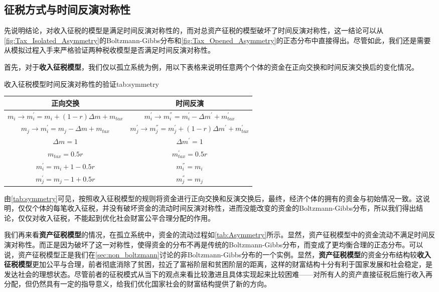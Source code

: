 \documentclass[tsinghuacite]{HustGraduPaper}
\begin{document}
	
		\subsection{征税方式与时间反演对称性}\label{subsec:tax_time_symmetry}
		
		
		先说明结论，对收入征税的模型是满足时间反演对称性的，而对总资产征税的模型破坏了时间反演对称性，这一结论可以从\autoref{fig:Tax_Isolated_Asymmetry}的Boltzmann-Gibbs分布和\autoref{fig:Tax_Opened_Asymmetry}的正态分布中直接得出。尽管如此，我们还是需要从模拟过程入手来严格验证两种税收模型是否满足时间反演对称性。
		
		首先，对于{\bfseries 收入征税模型}，我们仅以孤立系统为例，用以下表格来说明任意两个个体的资金在正向交换和时间反演交换后的变化情况。
		
		
	\begin{generaltab}{收入征税模型时间反演对称性的验证}{tab:symmetry}
		\begin{tabularx}{\textwidth}{CC}
			\toprule
			正向交换&时间反演\\
			\midrule
			$m_i \rightarrow m_i^{'} = m_i + (1-r) \Delta m + m_{tax}$ & $m_i^{'} \rightarrow m_i^{''} = m_i^{'} - \Delta m^{'} + m_{tax}^{'}$\\
			$m_j \rightarrow m_i^{'} = m_j - \Delta m + m_{tax}$ & $m_j^{'} \rightarrow m_j^{''} = m_j^{'} + (1-r) \Delta m^{'} + m_{tax}^{'}$\\
			$\Delta m = 1$ & $\Delta m^{'} = 1$  \\
			$m_{tax} = 0.5 r$ & $m_{tax}^{'} = 0.5 r$ \\
			\midrule
			$m_i^{'} = m_i + 1 - 0.5 r$ & $m_i^{''} = m_i $ \\
			$m_j^{'} = m_j - 1 + 0.5 r$ & $m_j^{''} = m_j $ \\
			\bottomrule
		\end{tabularx}
	\end{generaltab}


		由\autoref{tab:symmetry}可见，按照收入征税模型的规则将资金进行正向交换和反演交换后，最终，经济个体的拥有的资金与初始情况一致。这说明，仅仅个体的每笔收入征税，并没有破坏资金的流动时间反演对称性，进而没能改变的资金的Boltzmann-Gibbs分布，所以我们得出结论，仅仅对收入征税，不能起到优化社会财富公平合理分配的作用。
		
		我们再来看{\bfseries 资产征税模型}的情况，在孤立系统中，资金的流动过程如\autoref{tab:Asymmetry}所示。显然，资产征税模型中的资金流动不满足时间反演对称性。而正是因为破坏了这一对称性，使得资金的分布不再是传统的Boltzmann-Gibbs分布，而变成了更均衡合理的正态分布。可以说，资产征税模型正是我们在\autoref{sec:non_boltzmann}讨论的非Boltzmann-Gibbs分布的一个实例。显然，{\bfseries 资产征税模型}的资金分布结构较{\bfseries 收入征税模型}更加公平与合理，前者彻底消除了贫困，拉近了富裕阶层和贫困阶层的距离，这样的财富结构十分有利于国家发展和社会稳定，是发达社会的理想状态。尽管前者的征税模式从当下的观点来看比较激进且具体实现起来比较困难——对所有人的资产直接征税后施行收入再分配，但仍然具有一定的指导意义，给我们优化国家社会的财富结构提供了新的方向。
		
\end{document}
